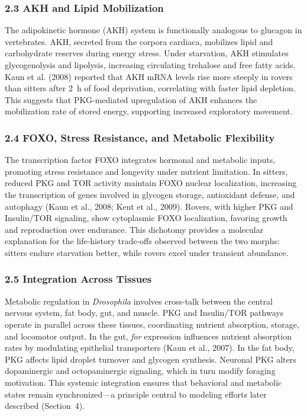 \documentclass[11pt]{article}
\begin{document}
\subsubsection*{2.3 AKH and Lipid Mobilization}

The adipokinetic hormone (AKH) system is functionally analogous to glucagon in vertebrates. AKH, secreted from the corpora cardiaca, mobilizes lipid and carbohydrate reserves during energy stress. Under starvation, AKH stimulates glycogenolysis and lipolysis, increasing circulating trehalose and free fatty acids. Kaun et al. (2008) reported that AKH mRNA levels rise more steeply in rovers than sitters after 2~h of food deprivation, correlating with faster lipid depletion. This suggests that PKG-mediated upregulation of AKH enhances the mobilization rate of stored energy, supporting increased exploratory movement.

\subsubsection*{2.4 FOXO, Stress Resistance, and Metabolic Flexibility}

The transcription factor FOXO integrates hormonal and metabolic inputs, promoting stress resistance and longevity under nutrient limitation. In sitters, reduced PKG and TOR activity maintain FOXO nuclear localization, increasing the transcription of genes involved in glycogen storage, antioxidant defense, and autophagy (Kaun et al., 2008; Kent et al., 2009). Rovers, with higher PKG and Insulin/TOR signaling, show cytoplasmic FOXO localization, favoring growth and reproduction over endurance. This dichotomy provides a molecular explanation for the life-history trade-offs observed between the two morphs: sitters endure starvation better, while rovers excel under transient abundance.

\subsubsection*{2.5 Integration Across Tissues}

Metabolic regulation in \emph{Drosophila} involves cross-talk between the central nervous system, fat body, gut, and muscle. PKG and Insulin/TOR pathways operate in parallel across these tissues, coordinating nutrient absorption, storage, and locomotor output. In the gut, \emph{for} expression influences nutrient absorption rates by modulating epithelial transporters (Kaun et al., 2007). In the fat body, PKG affects lipid droplet turnover and glycogen synthesis. Neuronal PKG alters dopaminergic and octopaminergic signaling, which in turn modify foraging motivation. This systemic integration ensures that behavioral and metabolic states remain synchronized---a principle central to modeling efforts later described (Section~4).
\end{document}
